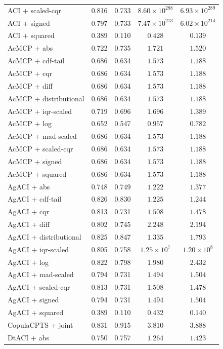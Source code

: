 \begin{longtable}{lcccc}
	ACI + scaled-cqr & 0.816 & 0.733 & $8.60 \times 10^{288}$ & $6.93 \times 10^{289}$ \\
	ACI + signed & 0.797 & 0.733 & $7.47 \times 10^{213}$ & $6.02 \times 10^{214}$ \\
	ACI + squared & 0.389 & 0.110 & $0.428$ & $0.139$ \\
	AcMCP + abs & 0.722 & 0.735 & $1.721$ & $1.520$ \\
	AcMCP + cdf-tail & 0.686 & 0.634 & $1.573$ & $1.188$ \\
	AcMCP + cqr & 0.686 & 0.634 & $1.573$ & $1.188$ \\
	AcMCP + diff & 0.686 & 0.634 & $1.573$ & $1.188$ \\
	AcMCP + distributional & 0.686 & 0.634 & $1.573$ & $1.188$ \\
	AcMCP + iqr-scaled & 0.719 & 0.696 & $1.696$ & $1.389$ \\
	AcMCP + log & 0.652 & 0.547 & $0.957$ & $0.782$ \\
	AcMCP + mad-scaled & 0.686 & 0.634 & $1.573$ & $1.188$ \\
	AcMCP + scaled-cqr & 0.686 & 0.634 & $1.573$ & $1.188$ \\
	AcMCP + signed & 0.686 & 0.634 & $1.573$ & $1.188$ \\
	AcMCP + squared & 0.686 & 0.634 & $1.573$ & $1.188$ \\
	AgACI + abs & 0.748 & 0.749 & $1.222$ & $1.377$ \\
	AgACI + cdf-tail & 0.826 & 0.830 & $1.225$ & $1.244$ \\
	AgACI + cqr & 0.813 & 0.731 & $1.508$ & $1.478$ \\
	AgACI + diff & 0.802 & 0.745 & $2.248$ & $2.194$ \\
	AgACI + distributional & 0.825 & 0.847 & $1.335$ & $1.793$ \\
	AgACI + iqr-scaled & 0.805 & 0.758 & $1.25 \times 10^{7}$ & $1.20 \times 10^{8}$ \\
	AgACI + log & 0.822 & 0.798 & $1.980$ & $2.432$ \\
	AgACI + mad-scaled & 0.794 & 0.731 & $1.494$ & $1.504$ \\
	AgACI + scaled-cqr & 0.813 & 0.731 & $1.508$ & $1.478$ \\
	AgACI + signed & 0.794 & 0.731 & $1.494$ & $1.504$ \\
	AgACI + squared & 0.389 & 0.110 & $0.432$ & $0.140$ \\
	CopulaCPTS + joint & 0.831 & 0.915 & $3.810$ & $3.888$ \\
	DtACI + abs & 0.750 & 0.757 & $1.264$ & $1.423$ \\

\end{longtable}
